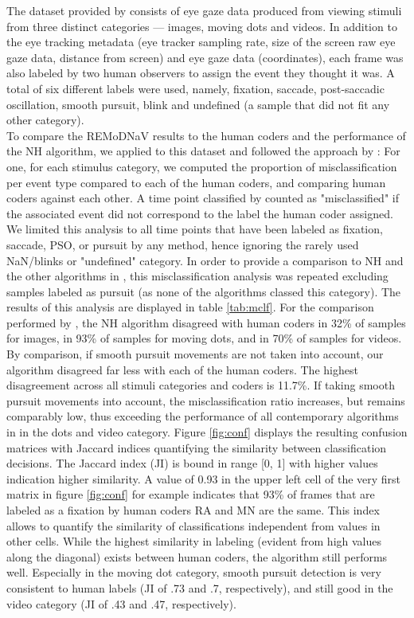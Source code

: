 The dataset provided by \citep{Andersson2017} consists of eye gaze data produced from viewing stimuli from three distinct categories --- images, moving dots and videos. In addition to the eye tracking metadata (eye tracker sampling rate, size of the screen raw eye gaze data, distance from screen) and eye gaze data (coordinates), each frame was also labeled by two human observers to assign the event they thought it was. A total of six different labels were used, namely, fixation, saccade, post-saccadic oscillation, smooth pursuit, blink and undefined (a sample that did not fit any other category). \\
To compare the REMoDNaV results to the human coders and the performance of the NH  algorithm, we applied \remodnav to this dataset and followed the approach by \citet{Andersson2017}: For one, for each stimulus category, we computed the proportion of misclassification per event type compared to each of the human coders, and comparing human coders against each other. A time point classified by \remodnav counted as "misclassified" if the associated event did not correspond to the label the human coder assigned. We limited this analysis to all time points that have been labeled as fixation, saccade, PSO, or pursuit by any method, hence ignoring the rarely used NaN/blinks or "undefined" category. In order to provide a comparison to NH and the other algorithms in \cite{Andersson2017}, this misclassification analysis was repeated excluding samples labeled as pursuit (as none of the algorithms classed this category). The results of this analysis are displayed in table \ref{tab:mclf}. For the comparison performed by \citet{Andersson2017}, the NH algorithm disagreed with human coders in 32\% of samples for images, in 93\% of samples for moving dots, and in 70\% of samples for videos. By comparison, if smooth pursuit movements are not taken into account, our algorithm disagreed far less with each of the human coders. The highest disagreement across all stimuli categories and coders is 11.7\%. If taking smooth pursuit movements into account, the misclassification ratio increases, but remains comparably low, thus exceeding the performance of all contemporary algorithms in \citet{Andersson2017} in the dots and video category. Figure \ref{fig:conf} displays the resulting confusion matrices with Jaccard indices quantifying the similarity between classification decisions. The Jaccard index (JI) is bound in range [0, 1] with higher values indication higher similarity. A value of 0.93 in the upper left cell of the very first matrix in figure \ref{fig:conf} for example indicates that 93\% of frames that are labeled as a fixation by human coders RA and MN are the same. This index allows to quantify the similarity of classifications independent from values in other cells. While the highest similarity in labeling (evident from high values along the diagonal) exists between human coders, the algorithm still performs well. Especially in the moving dot category, smooth pursuit detection is very consistent to human labels (JI of .73 and .7, respectively), and still good in the video category (JI of .43 and .47, respectively). \\

